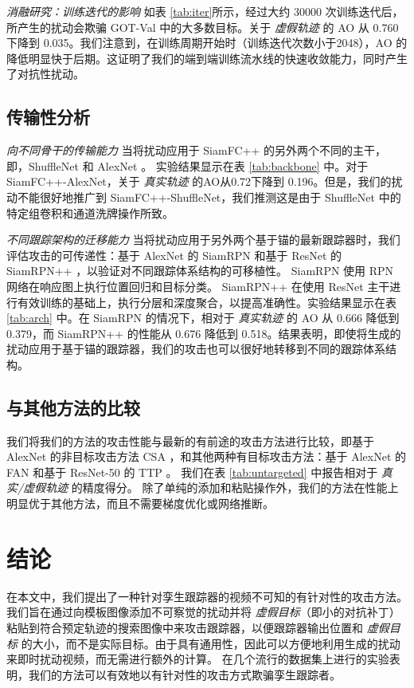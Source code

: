 \textit{消融研究：训练迭代的影响} 如表 \ref{tab:iter}所示，经过大约 30000 次训练迭代后，所产生的扰动会欺骗 GOT-Val 中的大多数目标。关于 \textit{虚假轨迹} 的 AO 从 0.760 下降到 0.035。我们注意到，在训练周期开始时（训练迭代次数小于2048），AO 的降低明显快于后期。这证明了我们的端到端训练流水线的快速收敛能力，同时产生了对抗性扰动。

\subsection{传输性分析}

\textit{向不同骨干的传输能力} 当将扰动应用于 SiamFC++ 的另外两个不同的主干，即，ShuffleNet \cite{ShuffleNet} 和 AlexNet \cite{AlexNet}。
实验结果显示在表 \ref{tab:backbone} 中。对于 SiamFC++-AlexNet，关于 \textit{真实轨迹} 的AO从0.72下降到 0.196。但是，我们的扰动不能很好地推广到 SiamFC++-ShuffleNet，我们推测这是由于 ShuffleNet 中的特定组卷积和通道洗牌操作所致。

\textit{不同跟踪架构的迁移能力} 当将扰动应用于另外两个基于锚的最新跟踪器时，我们评估攻击的可传递性：基于 AlexNet 的 SiamRPN \cite{SiamRPN} 和基于 ResNet 的 SiamRPN++ \cite{SiamRPN++}，以验证对不同跟踪体系结构的可移植性。
SiamRPN 使用 RPN 网络在响应图上执行位置回归和目标分类。 SiamRPN++ 在使用 ResNet 主干进行有效训练的基础上，执行分层和深度聚合，以提高准确性。实验结果显示在表 \ref{tab:arch} 中。在 SiamRPN 的情况下，相对于 \textit{真实轨迹} 的 AO 从 0.666 降低到 0.379，而 SiamRPN++ 的性能从 0.676 降低到 0.518。结果表明，即使将生成的扰动应用于基于锚的跟踪器，我们的攻击也可以很好地转移到不同的跟踪体系结构。

\subsection{与其他方法的比较}

我们将我们的方法的攻击性能与最新的有前途的攻击方法进行比较，即基于 AlexNet 的非目标攻击方法 CSA \cite{CSA}，和其他两种有目标攻击方法：基于 AlexNet 的 FAN \cite{FAN} 和基于 ResNet-50 的 TTP \cite{TTP}。
我们在表 \ref{tab:untargeted} 中报告相对于 \textit{真实/虚假轨迹} 的精度得分。
除了单纯的添加和粘贴操作外，我们的方法在性能上明显优于其他方法，而且不需要梯度优化或网络推断。

\section{结论}

在本文中，我们提出了一种针对孪生跟踪器的视频不可知的有针对性的攻击方法。
我们旨在通过向模板图像添加不可察觉的扰动并将 \textit{虚假目标}（即小的对抗补丁）粘贴到符合预定轨迹的搜索图像中来攻击跟踪器，以便跟踪器输出位置和 \textit{虚假目标} 的大小，而不是实际目标。由于具有通用性，因此可以方便地利用生成的扰动来即时扰动视频，而无需进行额外的计算。
在几个流行的数据集上进行的实验表明，我们的方法可以有效地以有针对性的攻击方式欺骗孪生跟踪者。

